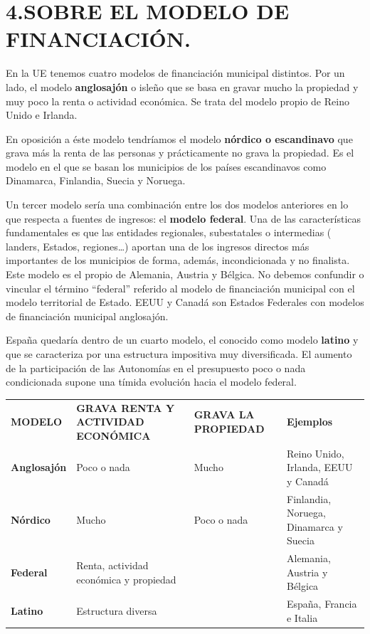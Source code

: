 \documentclass[
]{article}
\begin{document}
\hypertarget{sobre-el-modelo-de-financiaciuxf3n.}{%
\section{4.SOBRE EL MODELO DE
FINANCIACIÓN.}\label{sobre-el-modelo-de-financiaciuxf3n.}}

En la UE tenemos cuatro modelos de financiación municipal distintos. Por
un lado, el modelo \textbf{anglosajón} o isleño que se basa en gravar
mucho la propiedad y muy poco la renta o actividad económica. Se trata
del modelo propio de Reino Unido e Irlanda.

En oposición a éste modelo tendríamos el modelo \textbf{nórdico o
escandinavo} que grava más la renta de las personas y prácticamente no
grava la propiedad. Es el modelo en el que se basan los municipios de
los países escandinavos como Dinamarca, Finlandia, Suecia y Noruega.

Un tercer modelo sería una combinación entre los dos modelos anteriores
en lo que respecta a fuentes de ingresos: el \textbf{modelo federal}.
Una de las características fundamentales es que las entidades
regionales, subestatales o intermedias ( landers, Estados,
regiones\ldots) aportan una de los ingresos directos más importantes de
los municipios de forma, además, incondicionada y no finalista. Este
modelo es el propio de Alemania, Austria y Bélgica. No debemos confundir
o vincular el término ``federal'' referido al modelo de financiación
municipal con el modelo territorial de Estado. EEUU y Canadá son Estados
Federales con modelos de financiación municipal anglosajón.

España quedaría dentro de un cuarto modelo, el conocido como modelo
\textbf{latino} y que se caracteriza por una estructura impositiva muy
diversificada. El aumento de la participación de las Autonomías en el
presupuesto poco o nada condicionada supone una tímida evolución hacia
el modelo federal.

\begin{longtable}[]{@{}
  >{\raggedright\arraybackslash}p{}
  >{\raggedright\arraybackslash}p{}
  >{\raggedright\arraybackslash}p{}
  >{\raggedright\arraybackslash}p{}@{}}
\toprule\noalign{}
\endhead
\bottomrule\noalign{}
\endlastfoot
\textbf{MODELO} & \textbf{GRAVA RENTA Y ACTIVIDAD ECONÓMICA} &
\textbf{GRAVA LA PROPIEDAD} & \textbf{Ejemplos} \\
\textbf{Anglosajón} & Poco o nada & Mucho & Reino Unido, Irlanda, EEUU y
Canadá \\
\textbf{Nórdico} & Mucho & Poco o nada & Finlandia, Noruega, Dinamarca y
Suecia \\
\textbf{Federal} & Renta, actividad económica y propiedad & & Alemania,
Austria y Bélgica \\
\textbf{Latino} & Estructura diversa & & España, Francia e Italia \\
\end{longtable}
\end{document}
